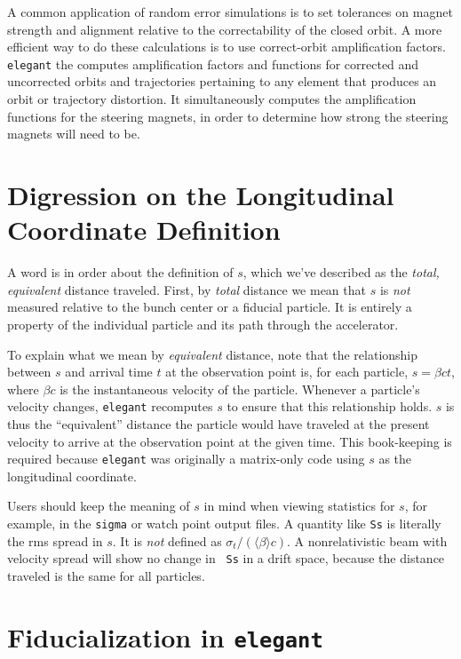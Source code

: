 \documentclass[11pt]{article}
\begin{document}
A common application of random error simulations is to set tolerances
on magnet strength and alignment relative to the correctability of the
closed orbit.  A more efficient way to do these calculations is to use
correct-orbit amplification factors\cite{Borland_PC}.  {\tt elegant}
the computes amplification factors and functions for corrected and
uncorrected orbits and trajectories pertaining to any element that
produces an orbit or trajectory distortion.  It simultaneously
computes the amplification functions for the steering magnets, in
order to determine how strong the steering magnets will need to be.

\section{Digression on the Longitudinal Coordinate Definition\label{sec:longitCoord}}

A word is in order about the definition of $s$, which we've described
as the {\em total, equivalent} distance traveled.  First, by {\em
total} distance we mean that $s$ is {\em not} measured relative to the
bunch center or a fiducial particle.  It is entirely a property of the
individual particle and its path through the accelerator.

To explain what we mean by {\em equivalent} distance, note that the
relationship between $s$ and arrival time $t$ at the observation point
is, for each particle, $s = \beta c t$, where $\beta c$ is the
instantaneous velocity of the particle.  Whenever a particle's
velocity changes, {\tt elegant} recomputes $s$ to ensure that this
relationship holds.  $s$ is thus the ``equivalent'' distance the
particle would have traveled at the present velocity to arrive at the
observation point at the given time.  This book-keeping is required
because {\tt elegant} was originally a matrix-only code using $s$ as
the longitudinal coordinate.

Users should keep the meaning of $s$ in mind when viewing statistics
for $s$, for example, in the {\tt sigma} or watch point output files.
A quantity like {\tt Ss} is literally the rms spread in $s$.  It is
{\em not} defined as $\sigma_t/(\langle \beta \rangle c)$.  A
nonrelativistic beam with velocity spread will show no change in {\tt
Ss} in a drift space, because the distance traveled is the same for
all particles.

\section{Fiducialization in {\tt elegant}}
\end{document}
